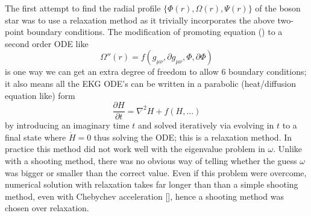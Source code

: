 \documentclass[11pt, oneside]{report}  %
\numberwithin{equation}{section}
\begin{document}
The first attempt to find the radial profile $\{\Phi(r),\Omega(r),\Psi(r)\}$ of the boson star was to use a relaxation method as it trivially incorporates the above two-point boundary conditions. The modification of promoting equation () to a second order ODE like \begin{equation}\Omega''(r) = f(g_{\mu\nu},\partial g_{\mu\nu},\Phi,\partial \Phi)\end{equation}
is one way we can get an extra degree of freedom to allow 6 boundary conditions; it also means all the EKG ODE's can be written in a parabolic (heat/diffusion equation like) form
\begin{equation} \frac{\partial H}{\partial t}  = \nabla^2 H + f(H,...) \end{equation}
by introducing an imaginary time $t$ and solved iteratively via evolving in $t$ to a final state where $\dot{H}=0$ thus solving the ODE; this is a relaxation method. In practice this method did not work well with the eigenvalue problem in $\omega$. Unlike with a shooting method, there was no obvious way of telling whether the guess $\omega$ was bigger or smaller than the correct value. Even if this problem were overcome, numerical solution with relaxation takes far longer than than a simple shooting method, even with Chebychev acceleration [], hence a shooting method was chosen over relaxation.
\end{document}
